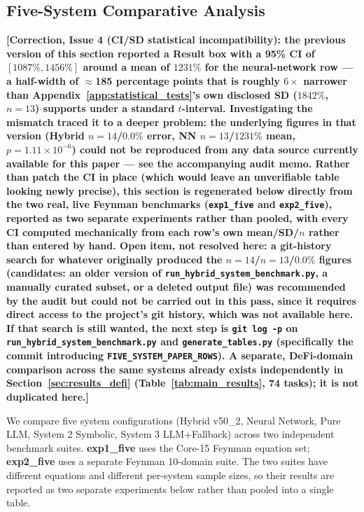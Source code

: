 \documentclass[twoside,11pt]{article}
\begin{document}
\subsection{Five-System Comparative Analysis}\label{subsec:fivesystem-comparative-analysis-feynman-}
\label{sec:five_systems}

\textbf{[Correction, Issue 4 (CI/SD statistical incompatibility): the
previous version of this section reported a Result box with a 95\% CI of
$[1087\%, 1456\%]$ around a mean of $1231\%$ for the neural-network row ---
a half-width of $\approx$185 percentage points that is roughly $6\times$
narrower than Appendix~\ref{app:statistical_tests}'s own disclosed SD
($1842\%$, $n=13$) supports under a standard $t$-interval. Investigating the
mismatch traced it to a deeper problem: the underlying figures in that
version (Hybrid $n=14$/$0.0\%$ error, NN $n=13$/$1231\%$ mean,
$p=1.11\times10^{-6}$) could not be reproduced from any data source
currently available for this paper --- see the accompanying audit memo.
Rather than patch the CI in place (which would leave an unverifiable table
looking newly precise), this section is regenerated below directly from
the two real, live Feynman benchmarks (\texttt{exp1\_five} and
\texttt{exp2\_five}), reported as two separate experiments rather than
pooled, with every CI computed mechanically from each row's own
mean/SD/$n$ rather than entered by hand.
\textbf{Open item, not resolved here:} a git-history search for whatever
originally produced the $n{=}14$/$n{=}13$/$0.0\%$ figures (candidates:
an older version of \texttt{run\_hybrid\_system\_benchmark.py}, a manually
curated subset, or a deleted output file) was recommended by the audit but
could not be carried out in this pass, since it requires direct access to
the project's git history, which was not available here. If that search is
still wanted, the next step is \texttt{git log -p} on
\texttt{run\_hybrid\_system\_benchmark.py} and \texttt{generate\_tables.py}
(specifically the commit introducing \texttt{FIVE\_SYSTEM\_PAPER\_ROWS}).
A separate, DeFi-domain comparison across the same systems already exists
independently in Section~\ref{sec:results_defi} (Table~\ref{tab:main_results},
74 tasks); it is not duplicated here.]}

We compare five system configurations (Hybrid v50\_2, Neural Network, Pure
LLM, System 2 Symbolic, System 3 LLM+Fallback) across two independent
benchmark suites. \textbf{exp1\_five} uses the Core-15 Feynman equation set;
\textbf{exp2\_five} uses a separate Feynman 10-domain suite. The two suites
have different equations and different per-system sample sizes, so their
results are reported as two separate experiments below rather than pooled
into a single table.
\end{document}
